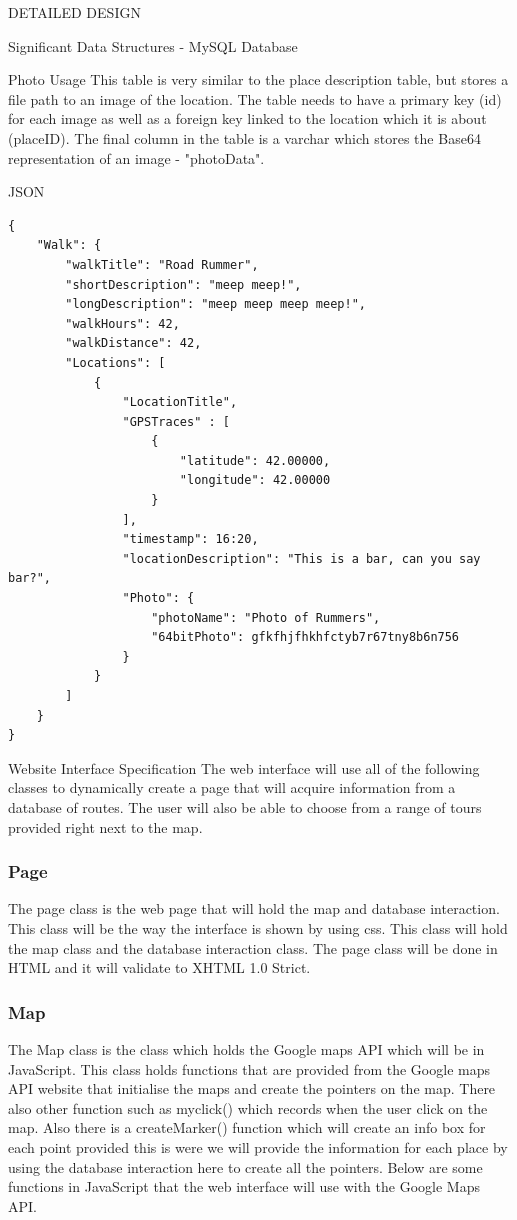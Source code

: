 \documentclass{article}
\begin{document}
\begin{section}{DETAILED DESIGN}
\begin{subsection}{Significant Data Structures - MySQL Database}
		\begin{subsubsection}{Photo Usage}
			This table is very similar to the place description table, but stores a file path to an image of the location. The table needs to have a primary key (id) for each image as well as a foreign key linked to the location which it is about (placeID). The final column in the table is a varchar which stores the Base64 representation of an image - "photoData".
		\end{subsubsection}

		\clearpage
		\begin{subsubsection}{JSON}
			\begin{lstlisting}
{
	"Walk": {
		"walkTitle": "Road Rummer",
		"shortDescription": "meep meep!",
		"longDescription": "meep meep meep meep!",
		"walkHours": 42,
		"walkDistance": 42,
		"Locations": [
			{
				"LocationTitle",
				"GPSTraces" : [
					{
						"latitude": 42.00000,
						"longitude": 42.00000
					}
				],
				"timestamp": 16:20,
				"locationDescription": "This is a bar, can you say bar?",
				"Photo": {
					"photoName": "Photo of Rummers",	
					"64bitPhoto": gfkfhjfhkhfctyb7r67tny8b6n756
				}
			}
		]
	}
}
			\end{lstlisting}
		\end{subsubsection}
	\end{subsection}
	
	\begin{subsection}{Website Interface Specification}
		The web interface will use all of the following classes to dynamically create a page that will acquire information from a database of routes. The user will also be able to choose from a range of tours provided right next to the map. 

		\subsubsection{Page}
			The page class is the web page that will hold the map and database interaction. This class will be the way the interface is shown by using css. This class will hold the map class and the database interaction class. The page class will be done in HTML and it will validate to XHTML 1.0 Strict. 

		\subsubsection{Map}
			The Map class is the class which holds the Google maps API which will be in JavaScript. This class holds functions that are provided from the Google maps API website that initialise the maps and create the pointers on the map. There also other function such as myclick() which records when the user click on the map. Also there is a createMarker() function which will create an info box for each point provided this is were we will provide the information for each place by using the database interaction here to create all the pointers. Below are some functions in JavaScript that the web interface will use with the Google Maps API.


\end{subsection}
\end{section}
\end{document}

